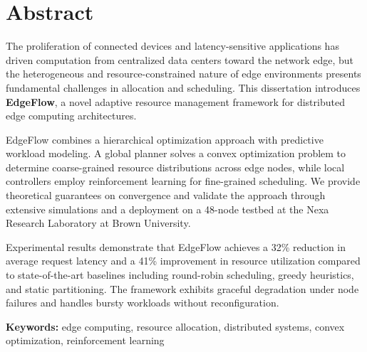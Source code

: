 \chapter*{Abstract}

The proliferation of connected devices and latency-sensitive applications has driven computation from centralized data centers toward the network edge, but the heterogeneous and resource-constrained nature of edge environments presents fundamental challenges in allocation and scheduling. This dissertation introduces \textbf{EdgeFlow}, a novel adaptive resource management framework for distributed edge computing architectures.

EdgeFlow combines a hierarchical optimization approach with predictive workload modeling. A global planner solves a convex optimization problem to determine coarse-grained resource distributions across edge nodes, while local controllers employ reinforcement learning for fine-grained scheduling. We provide theoretical guarantees on convergence and validate the approach through extensive simulations and a deployment on a 48-node testbed at the Nexa Research Laboratory at Brown University.

Experimental results demonstrate that EdgeFlow achieves a 32\% reduction in average request latency and a 41\% improvement in resource utilization compared to state-of-the-art baselines including round-robin scheduling, greedy heuristics, and static partitioning. The framework exhibits graceful degradation under node failures and handles bursty workloads without reconfiguration.

\vspace{0.8cm}
\noindent\textbf{Keywords:} edge computing, resource allocation, distributed systems, convex optimization, reinforcement learning

\clearpage

